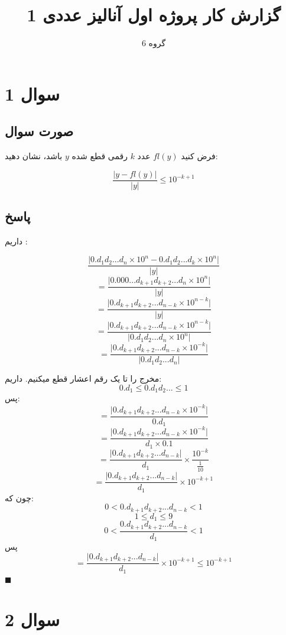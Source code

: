 \documentclass[12pt, letterpaper]{article}
\title{گزارش کار پروژه اول آنالیز عددی 1}
\author{گروه 6}
\begin{document}
\maketitle

\section{سوال 1}
\subsection{صورت سوال}
فرض کنید \(fl(y)\) عدد \(k\) رقمی قطع شده \(y\) باشد، نشان دهید:

\[\frac{\big| y-fl(y) \big| }{\big| y \big|} \le 10^{-k+1}\]

\subsection{پاسخ}
داریم :

\[  \frac{ \big| 0.d_{1}d_{2}...d_{n} \times{10^n} - 0.d_{1}d_{2}...d_{k} \times{10^n} \big|}{ \big| y \big|}  \]
\[  =   \frac{ \big| 0.000...d_{k+1}d_{k+2}...d_{n} \times{10^n}\big|}{ \big| y \big|}  \]
\[  =   \frac{ \big| 0.d_{k+1}d_{k+2}...d_{n-k} \times{10^{n-k}}\big|}{ \big| y \big|}  \]
\[  =   \frac{ \big| 0.d_{k+1}d_{k+2}...d_{n-k} \times{10^{n-k}}\big|}{ \big| 0.d_{1}d_{2}...d_{n} \times{10^n} \big|}  \]
\[  =   \frac{ \big| 0.d_{k+1}d_{k+2}...d_{n-k} \times{10^{-k}}\big|}{ \big| 0.d_{1}d_{2}...d_{n} \big|}  \]

مخرج را تا یک رقم اعشار قطع میکنیم. داریم:
\[ 0.d_{1} \le 0.d_{1}d_{2}... \le 1\]
پس:
\[  = \frac{ \big| 0.d_{k+1}d_{k+2}...d_{n-k} \times{10^{-k}}\big|}{ 0.d_{1}}  \]
\[  = \frac{ \big| 0.d_{k+1}d_{k+2}...d_{n-k} \times{10^{-k}}\big|}{ d_{1} \times 0.1}  \]
\[  = \frac{ \big| 0.d_{k+1}d_{k+2}...d_{n-k}\big|}{ d_{1}} \times \frac{10^{-k}}{\frac{1}{10}}  \]
\[  = \frac{ \big| 0.d_{k+1}d_{k+2}...d_{n-k}\big|}{ d_{1}} \times 10^{-k+1}  \]
چون که:
\[0 < 0.d_{k+1}d_{k+2}...d_{n-k} < 1\]
\[ 1 \le d_{1} \le 9\]
\[0 < \frac{ 0.d_{k+1}d_{k+2}...d_{n-k}}{d_{1}} < 1\]
پس
\[  = \frac{ \big| 0.d_{k+1}d_{k+2}...d_{n-k}\big|}{ d_{1}} \times 10^{-k+1}  \le 10^{-k+1} \]
$\blacksquare$



\vspace{5mm}

\section{سوال 2}
\end{document}
